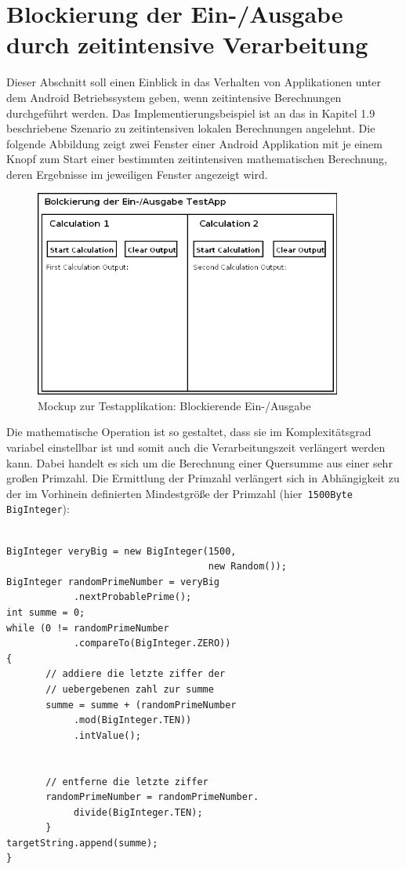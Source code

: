 \documentclass[12pt,oneside,a4paper,bibtotoc,liststotoc]{scrreprt}
\begin{document}
\section{Blockierung der Ein-/Ausgabe durch zeitintensive Verarbeitung}
Dieser Abschnitt soll einen Einblick in das Verhalten von Applikationen unter dem Android Betriebssystem geben, wenn zeitintensive Berechnungen durchgeführt werden. Das Implementierungsbeispiel ist an das in Kapitel 1.9 beschriebene Szenario zu zeitintensiven lokalen Berechnungen angelehnt.
Die folgende Abbildung zeigt zwei Fenster einer Android Applikation mit je einem Knopf zum Start einer bestimmten zeitintensiven mathematischen Berechnung, deren Ergebnisse im jeweiligen Fenster angezeigt wird.
\begin{figure}[H]
  \begin{centering}
    \includegraphics[width=0.9\textwidth]{img/BlockingIO_testApp_Mockup.png}
    \caption{Mockup zur Testapplikation: Blockierende Ein-/Ausgabe}
    \label{BlockingIO_testApp_Mockup}
  \end{centering}
\end{figure}
Die mathematische Operation ist so gestaltet, dass sie im Komplexitätsgrad variabel einstellbar ist und somit auch die Verarbeitungszeit verlängert werden kann. Dabei handelt es sich um die Berechnung einer Quersumme aus einer sehr großen Primzahl. Die Ermittlung der Primzahl verlängert sich in Abhängigkeit zu der im Vorhinein definierten Mindestgröße der Primzahl (hier\texttt{ 1500Byte BigInteger}):\newline
\begin{lstlisting}

BigInteger veryBig = new BigInteger(1500, 
									new Random());
BigInteger randomPrimeNumber = veryBig
			.nextProbablePrime();
int summe = 0;
while (0 != randomPrimeNumber
			.compareTo(BigInteger.ZERO)) 
{ 
       // addiere die letzte ziffer der 
       // uebergebenen zahl zur summe 
       summe = summe + (randomPrimeNumber
			.mod(BigInteger.TEN))
			.intValue(); 
       					
       				
       // entferne die letzte ziffer 
       randomPrimeNumber = randomPrimeNumber.
       		divide(BigInteger.TEN); 
       } 
targetString.append(summe);
}
\end{lstlisting}
\end{document}
